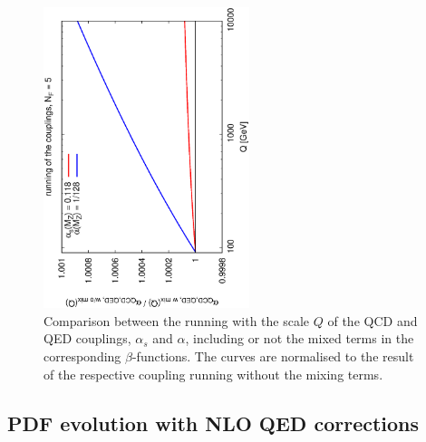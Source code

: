 \begin{figure}[h]
\includegraphics[width=6cm,angle=270]{figs/couplings.eps} 
\caption{Comparison between the running with the scale
$Q$ of the QCD and QED couplings,
  $\alpha_s$ and $\alpha$, including or not the mixed terms in
  the corresponding $\beta$-functions.
%
  The curves are normalised to the result of the respective coupling
  running without the mixing terms.}
\label{fig:CouplingEvol}
\end{figure}

\subsection{PDF evolution with NLO QED corrections}

